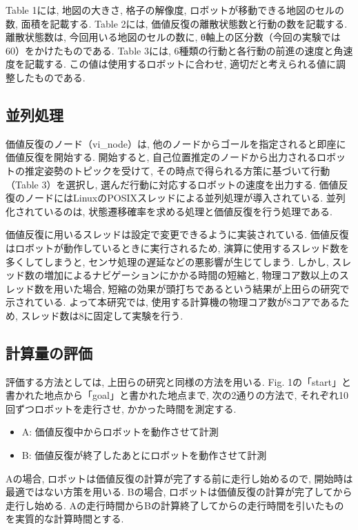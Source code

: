 \documentclass{jarticle}
\begin{document}
Table 1には, 地図の大きさ, 格子の解像度, ロボットが移動できる地図のセルの数, 面積を記載する.
Table 2には, 価値反復の離散状態数と行動の数を記載する.
離散状態数は, 今回用いる地図のセルの数に, θ軸上の区分数（今回の実験では60）をかけたものである.
Table 3には, 6種類の行動と各行動の前進の速度と角速度を記載する.
この値は使用するロボットに合わせ, 適切だと考えられる値に調整したものである.





\subsection{並列処理}
価値反復のノード（vi\_node）は, 他のノードからゴールを指定されると即座に価値反復を開始する.
開始すると, 自己位置推定のノードから出力されるロボットの推定姿勢のトピックを受けて, 
その時点で得られる方策に基づいて行動（Table 3）を選択し, 選んだ行動に対応するロボットの速度を出力する.
価値反復のノードにはLinuxのPOSIXスレッドによる並列処理が導入されている. 
並列化されているのは, 状態遷移確率を求める処理と価値反復を行う処理である.

価値反復に用いるスレッドは設定で変更できるように実装されている. 
価値反復はロボットが動作しているときに実行されるため, 
演算に使用するスレッド数を多くしてしまうと, センサ処理の遅延などの悪影響が生じてしまう. 
しかし, スレッド数の増加によるナビゲーションにかかる時間の短縮と, 
物理コア数以上のスレッド数を用いた場合, 短縮の効果が頭打ちであるという結果が上田らの研究\cite{上田rsj2021}で示されている. 
よって本研究では, 使用する計算機の物理コア数が8コアであるため, スレッド数は8に固定して実験を行う.
\subsection{計算量の評価}
評価する方法としては, 上田らの研究\cite{上田rsj2021}と同様の方法を用いる. 
Fig. 1の「start」と書かれた地点から「goal」と書かれた地点まで, 
次の2通りの方法で, それぞれ10回ずつロボットを走行させ, かかった時間を測定する.

\begin{itemize}
	\item A: 価値反復中からロボットを動作させて計測
	\item B: 価値反復が終了したあとにロボットを動作させて計測
\end{itemize}

Aの場合, ロボットは価値反復の計算が完了する前に走行し始めるので, 開始時は最適ではない方策を用いる.
Bの場合, ロボットは価値反復の計算が完了してから走行し始める. 
Aの走行時間からBの計算終了してからの走行時間を引いたものを実質的な計算時間とする.
\end{document}
